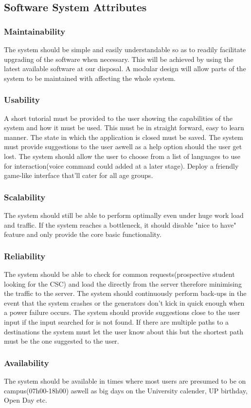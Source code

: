 \documentclass[a4paper,12pt]{report}
\begin{document}
\subsection{Software System Attributes} 
\subsubsection{Maintainability}
The system should be simple and easily understandable so as to readily facilitate upgrading of the software when necessary. This will be achieved by using the latest available software at our disposal. A modular design will allow parts of the system to be maintained with affecting the whole system.
\subsubsection{Usability}
A short tutorial must be provided to the user showing the capabilities of the system and how it must be used. This must be in straight forward, easy to learn manner. The state in which the application is closed must be saved. The system must provide suggestions to the user aswell as a help option should the user get lost. The system should allow the user to choose from a list of languages to use for interaction(voice command could added at a later stage). Deploy a friendly game-like interface that'll cater for all age groups.
\subsubsection{Scalability}
The system should still be able to perform optimally even under huge work load and traffic. If the system reaches a bottleneck, it should disable "nice to have" feature and only provide the core basic functionality. 
\subsubsection{Reliability}
The system should be able to check for common requests(prospective student looking for the CSC) and load the directly from the server therefore minimising the traffic to the server. The system should continuously perform back-ups in the event that the system crashes or the generators don't kick in quick enough when a power failure occurs. The system should provide suggestions close to the user input if the input searched for is not found. If there are multiple paths to a destinations the system must let the user know about this but the shortest path must be the one suggested to the user.
\subsubsection{Availability}
The system should be available in times where most users are presumed to be on campus(07h00-18h00) aswell as big days on the University calender, UP birthday, Open Day etc.
\end{document}
